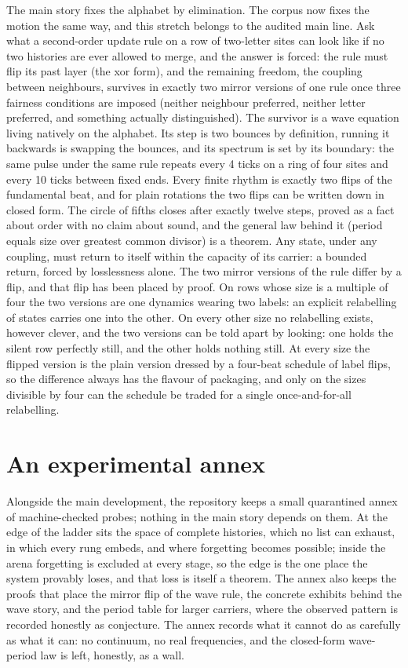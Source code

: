 \documentclass[11pt,a4paper]{article}
\begin{document}
The main story fixes the alphabet by elimination. The corpus now
fixes the motion the same way, and this stretch belongs to the
audited main line. Ask what a second-order update rule on a row of
two-letter sites can look like if no two histories are ever allowed
to merge, and the answer is forced: the rule must flip its past layer
(the xor form), and the remaining freedom, the coupling between
neighbours, survives in exactly two mirror versions of one rule once
three fairness conditions are imposed (neither neighbour preferred,
neither letter preferred, and something actually distinguished). The
survivor is a wave equation living natively on the alphabet. Its step
is two bounces by definition, running it backwards is swapping the
bounces, and its spectrum is set by its boundary: the same pulse
under the same rule repeats every 4 ticks on a ring of four sites and
every 10 ticks between fixed ends. Every finite rhythm is exactly
two flips of the fundamental beat, and for plain rotations the two
flips can be written down in closed form. The circle of fifths closes
after exactly twelve steps, proved as a fact about order with no
claim about sound, and the general law behind it (period equals size
over greatest common divisor) is a theorem. Any state, under any
coupling, must return to itself within the capacity of its carrier:
a bounded return, forced by losslessness alone. The two mirror
versions of the rule differ by a flip, and that flip has been placed
by proof. On rows whose size is a multiple of four the two versions
are one dynamics wearing two labels: an explicit relabelling of
states carries one into the other. On every other size no
relabelling exists, however clever, and the two versions can be told
apart by looking: one holds the silent row perfectly still, and the
other holds nothing still. At every size the flipped version is the
plain version dressed by a four-beat schedule of label flips, so the
difference always has the flavour of packaging, and only on the
sizes divisible by four can the schedule be traded for a single
once-and-for-all relabelling.

\vspace{0.45em}
\section*{An experimental annex}

Alongside the main development, the repository keeps a small
quarantined annex of machine-checked probes; nothing in the main
story depends on them. At the edge of the ladder sits the space of
complete histories, which no list can exhaust, in which every rung
embeds, and where forgetting becomes possible; inside the arena
forgetting is excluded at every stage, so the edge is the one place
the system provably loses, and that loss is itself a theorem. The
annex also keeps the proofs that place the mirror flip of the wave
rule, the concrete exhibits behind the wave story, and the period
table for larger carriers, where the observed pattern is recorded
honestly as conjecture. The annex records what it cannot do
as carefully as what it can: no continuum, no real frequencies, and
the closed-form wave-period law is left, honestly, as a wall.
\end{document}
